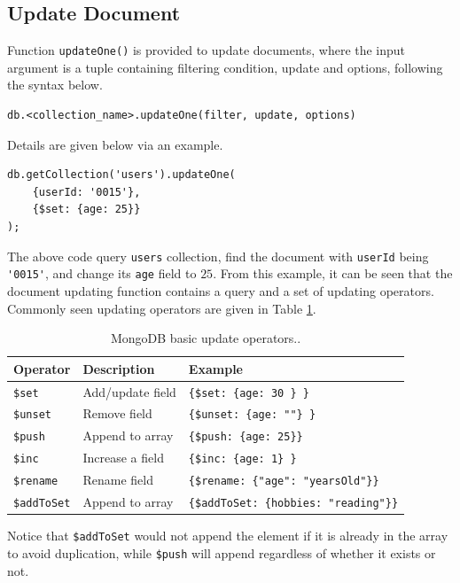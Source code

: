 \subsection{Update Document}

Function \verb|updateOne()| is provided to update documents, where the input argument is a tuple containing filtering condition, update and options, following the syntax below.
\begin{lstlisting}
db.<collection_name>.updateOne(filter, update, options)
\end{lstlisting}
Details are given below via an example.
\begin{lstlisting}
db.getCollection('users').updateOne(
	{userId: '0015'},
	{$set: {age: 25}}
);
\end{lstlisting}
The above code query \verb|users| collection, find the document with \verb|userId| being \verb|'0015'|, and change its \verb|age| field to $25$. From this example, it can be seen that the document updating function contains a query and a set of updating operators. Commonly seen updating operators are given in Table \ref{ch:db:tab:mongodbupdateoperator}.

\begin{table}
	\centering \caption{MongoDB basic update operators..}\label{ch:db:tab:mongodbupdateoperator}
	\begin{tabularx}{\textwidth}{llX}
		\hline
		Operator & Description & Example \\ \hline
		\verb|$set| & Add/update field & \verb|{$set: {age: 30 } }| \\ 
		\verb|$unset| & Remove field & \verb|{$unset: {age: ""} }| \\ 
		\verb|$push| & Append to array & \verb|{$push: {age: 25}}| \\ 
		\verb|$inc| & Increase a field & \verb|{$inc: {age: 1} }| \\ 
		\verb|$rename| & Rename field &  \verb|{$rename: {"age": "yearsOld"}}| \\ 
		\verb|$addToSet| & Append to array & \verb|{$addToSet: {hobbies: "reading"}}| \\
		\hline
	\end{tabularx}
	\begin{flushleft}
		\footnotesize
		Notice that \verb|$addToSet| would not append the element if it is already in the array to avoid duplication, while \verb|$push| will append regardless of whether it exists or not.  
	\end{flushleft}
\end{table}

